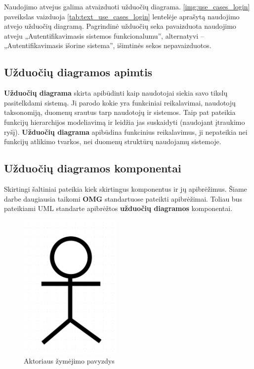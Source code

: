 Naudojimo atvejus galima atvaizduoti užduočių diagrama. \ref{img:use_cases_login} paveikslas vaizduoja \ref{tab:text_use_cases_login} lentelėje aprašytą naudojimo atvejo užduočių diagramą. Pagrindinė užduočių seka pavaizduota naudojimo atveju „Autentifikavimasis sistemos funkcionalumu”,  alternatyvi – „Autentifikavimasis išorine sistema”, išimtinės sekos nepavaizduotos.


\subsection{\textbf{Užduočių diagramos} apimtis}
\textbf{Užduočių diagrama} skirta apibūdinti kaip naudotojai siekia savo tikslų pasitelkdami sistemą. Ji parodo kokie yra funkciniai reikalavimai, naudotojų taksonomiją, duomenų srautus tarp naudotojų ir sistemos. Taip pat pateikia funkcijų hierarchijos modeliavimą ir leidžia jas suskaidyti (naudojant įtraukimo ryšį). \textbf{Užduočių diagrama} apibūdina funkcinius reikalavimus, ji nepateikia nei funkcijų atlikimo tvarkos, nei duomenų struktūrų naudojamų sistemoje.

\subsection{\textbf{Užduočių diagramos} komponentai} \label{section:use_cases_components}
Skirtingi šaltiniai pateikia kiek skirtingus komponentus ir jų apibrėžimus. Šiame darbe daugiausia taikomi \textbf{OMG} standartuose pateikti apibrėžimai. Toliau bus pateikiami UML standarte apibrėžtos \textbf{užduočių diagramos} komponentai.

\begin{figure}[H]
	\centering
	\includegraphics[width=5cm]{img/use_case_components/actor}
	\caption{Aktoriaus žymėjimo pavyzdys}
	\label{img:use_case_components_actor}
\end{figure}

